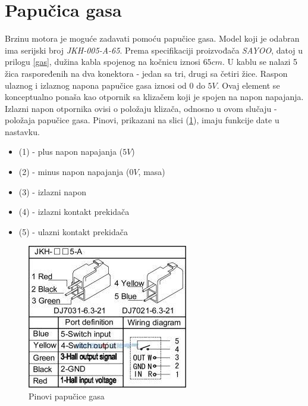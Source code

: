 \section{Papučica gasa}

\qquad Brzinu motora je moguće zadavati pomoću papučice gasa. Model koji je odabran ima serijski broj \textit{JKH-005-A-65}. Prema specifikaciji proizvođača \textit{SAYOO}, datoj u prilogu \ref{gas}, dužina kabla spojenog na kočnicu iznosi $65cm$. U kablu se nalazi 5 žica raspoređenih na dva konektora - jedan sa tri, drugi sa četiri žice. Raspon ulaznog i izlaznog napona papučice gasa iznosi od $0$ do $5V$. Ovaj element se konceptualno ponaša kao otpornik sa klizačem koji je spojen na napon napajanja. Izlazni napon otpornika ovisi o položaju klizača, odnosno u ovom slučaju - položaja papučice gasa. Pinovi, prikazani na slici (\ref{fig:gas}), imaju funkcije date u nastavku.

\begin{itemize}
	\item (1) - plus napon napajanja ($5V$)
	\item (2) - minus napon napajanja ($0V$, masa)
	\item (3) - izlazni napon
	\item (4) - izlazni kontakt prekidača
	\item (5) - ulazni kontakt prekidača
\end{itemize}

\begin{figure}
\centering
\includegraphics[scale=1]{slike/foot_throttle.png}
\caption{Pinovi papučice gasa}
\label{fig:gas}
\end{figure}






